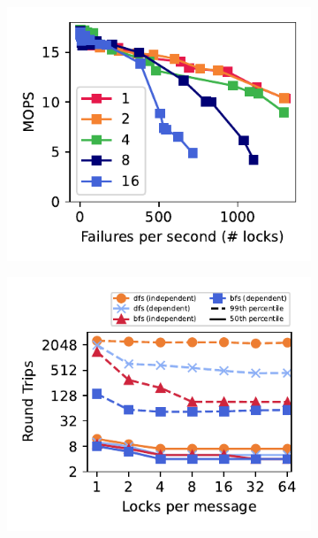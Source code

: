 \begin{figure}[t]
    \centering
    \newcommand{\subfigwidth}{0.24\linewidth}
    \begin{subfigure}{\subfigwidth}
      \includegraphics[width=0.99\linewidth]{fig/fault-rate.pdf}
          \end{subfigure}
    \begin{subfigure}{\subfigwidth}
        \includegraphics[width=0.99\linewidth]{fig/search_dependence.pdf}

\end{subfigure}
\end{figure}
